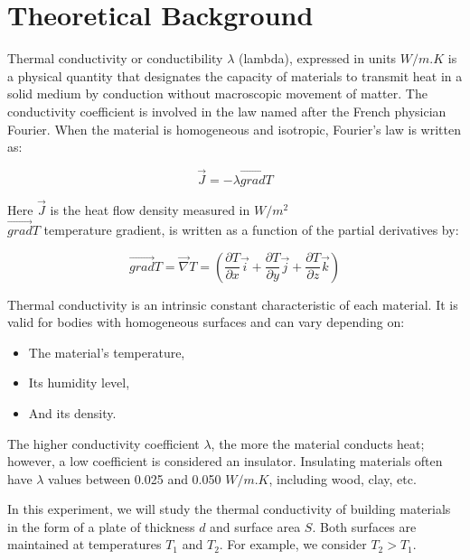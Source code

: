\documentclass[12pt,a4paper,twoside]{article}
\begin{document}
\section{Theoretical Background}




Thermal conductivity or conductibility $\lambda$ (lambda), expressed in units $W/m.K$ is a physical quantity that designates the capacity of materials to transmit heat in a solid medium by conduction without macroscopic movement of matter. The conductivity coefficient is involved in the law named after the French physician Fourier. When the material is homogeneous and isotropic, Fourier's law is written as:

\begin{equation}
\vec{J} = -\lambda \vec{grad} T
\end{equation}

Here $\vec{J}$ is the heat flow density measured in $W/m^2$ \\
$\vec{grad} T$ temperature gradient, is written as a function of the partial derivatives by:

\begin{equation}
\vec{grad} T = \vec{\nabla} T = \left( \frac{\partial T}{\partial x} \vec{i} + \frac{\partial T}{\partial y} \vec{j} + \frac{\partial T}{\partial z} \vec{k} \right)
\end{equation}

Thermal conductivity is an intrinsic constant characteristic of each material. It is valid for bodies with homogeneous surfaces and can vary depending on:

\begin{itemize}
    \item The material's temperature,
    \item Its humidity level,
    \item And its density.
\end{itemize}

The higher conductivity coefficient $\lambda$, the more the material conducts heat; however, a low coefficient is considered an insulator. Insulating materials often have $\lambda$ values between 0.025 and 0.050 $W/m.K$, including wood, clay, etc.

In this experiment, we will study the thermal conductivity of building materials in the form of a plate of thickness $d$ and surface area $S$. Both surfaces are maintained at temperatures $T_1$ and $T_2$. For example, we consider $T_2 > T_1$.
\end{document}
